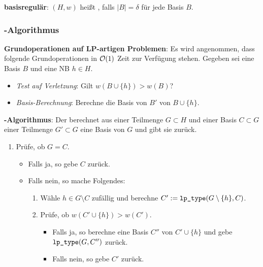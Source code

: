 \textbf{basisregulär}:
$(H, w)$ heißt , falls $|B| = \delta$ für jede Basis $B$.

\subsubsection{%
    -Algorithmus%
}

\textbf{Grundoperationen auf LP-artigen Problemen}:
Es wird angenommen, dass folgende Grundoperationen in $\mathcal{O}(1)$ Zeit zur Verfügung stehen.
Gegeben sei eine Basis $B$ und eine NB $h \in H$.
\begin{itemize}
    \item
    \emph{Test auf Verletzung}:
    Gilt $w(B \cup \{h\}) > w(B)$?

    \item
    \emph{Basis-Berechnung}:
    Berechne die Basis von $B'$ von $B \cup \{h\}$.
\end{itemize}

\textbf{-Algorithmus}:
Der  berechnet aus einer Teilmenge $G \subset H$ und
einer Basis $C \subset G$ einer Teilmenge $G' \subset G$ eine Basis von $G$ und gibt sie zurück.
\begin{enumerate}
    \item
    Prüfe, ob $G = C$.
    \begin{itemize}
        \item
        Falls ja, so gebe $C$ zurück.

        \item
        Falls nein, so mache Folgendes:
        \begin{enumerate}
            \item
            Wähle $h \in G \setminus C$ zufällig und
            berechne $C' := \texttt{lp\_type}(G \setminus \{h\}, C)$.

            \item
            Prüfe, ob $w(C' \cup \{h\}) > w(C')$.
            \begin{itemize}
                \item
                Falls ja, so berechne eine Basis $C''$ von $C' \cup \{h\}$
                und gebe $\texttt{lp\_type}(G, C'')$ zurück.

                \item
                Falls nein, so gebe $C'$ zurück.
            \end{itemize}
        \end{enumerate}
    \end{itemize}
\end{enumerate}

